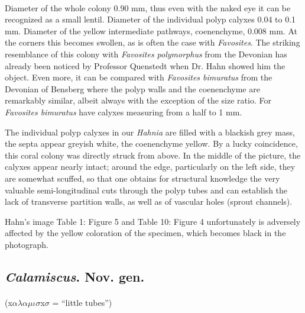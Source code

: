 \documentclass[a4paper, 12pt, oneside]{article}
\begin{document}
\paragraph{}
Diameter of the whole colony 0.90 mm, thus even with the naked eye it can be recognized as a small lentil. Diameter of the individual polyp calyxes 0.04 to 0.1 mm. Diameter of the yellow intermediate pathways, coenenchyme, 0.008 mm. At the corners this becomes swollen, as is often the case with \emph{Favosites}. The striking resemblance of this colony with \emph{Favosites polymorphus} from the Devonian has already been noticed by Professor Quenstedt when Dr. Hahn showed him the object. Even more, it can be compared with \emph{Favosites bimuratus} from the Devonian of Bensberg where the polyp walls and the coenenchyme are remarkably similar, albeit always with the exception of the size ratio. For \emph{Favosites bimuratus} have calyxes measuring from a half to 1 mm.

The individual polyp calyxes in our \emph{Hahnia} are filled with a blackish grey mass, the septa appear greyish white, the coenenchyme yellow. By a lucky coincidence, this coral colony was directly struck from above. In the middle of the picture, the calyxes appear nearly intact; around the edge, particularly on the left side, they are somewhat scuffed, so that one obtains for structural knowledge the very valuable semi-longitudinal cuts through the polyp tubes and can establish the lack of transverse partition walls, as well as of vascular holes (sprout channels).

Hahn's image Table 1: Figure 5 and Table 10: Figure 4 unfortunately is adversely affected by the yellow coloration of the specimen, which becomes black in the photograph.
\subsection{\emph{Calamiscus}. Nov. gen.}
\paragraph{}
(x$\alpha\lambda\alpha\mu\iota\sigma$x$\sigma$ = ``little tubes'')%
\end{document}
